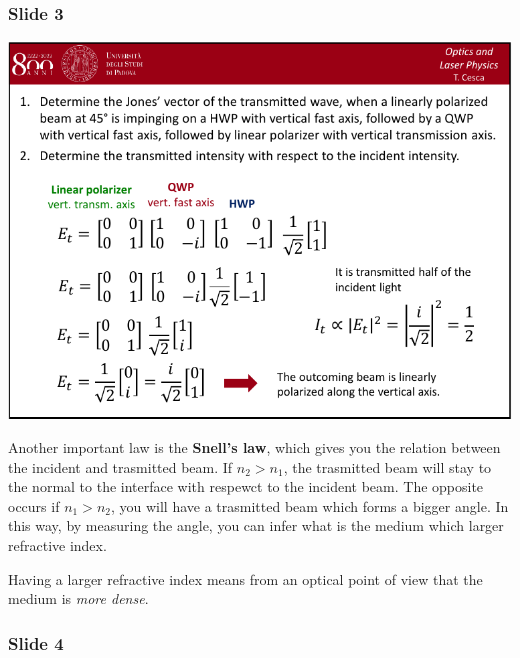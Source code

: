 \documentclass[../main/main.tex]{subfiles}
\begin{document}
\subsubsection*{Slide 3}

\begin{minipage}[]{0.5\linewidth}
\centering
\includegraphics[page=3,width=1\textwidth]{../lessons/pdf_file/04_lecture.pdf}
\end{minipage}
\hspace{0.3cm}\vspace{0.3cm}
\begin{minipage}[c]{0.47\linewidth}

Another important law is the \textbf{Snell's law}, which gives you the relation between the incident and trasmitted beam. If \( n_2 > n_1 \), the trasmitted beam will stay to the normal to the interface with respewct to the incident beam. The opposite occurs if \( n_1 > n_2 \), you will have a trasmitted beam which forms a bigger angle. In this way, by measuring the angle, you can infer what is the medium which larger refractive index.

Having a larger refractive index means from an optical point of view that the medium is \emph{more dense}.

\end{minipage}

\newpage

\subsubsection*{Slide 4}
\end{document}
